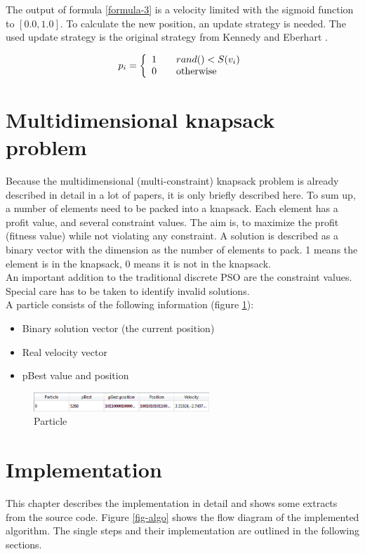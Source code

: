 \documentclass{article}
\begin{document}
The output of formula \ref{formula-3} is a velocity limited with the sigmoid function to $[0.0, 1.0]$. To calculate the new position, an update strategy is needed. The used update strategy is the original strategy from Kennedy and Eberhart \cite{bib-discrete}.

\begin{equation}
p_i = \left\{ 
\begin{array}{l l}
  1 & \quad \text{$rand() < S(v_i)$}\\
  0 & \quad \text{otherwise}
\end{array} \right.
\end{equation}


\section{Multidimensional knapsack problem}
\label{lbl-mknap}
Because the multidimensional (multi-constraint) knapsack problem is already described in detail in a lot of papers, it is only briefly described here. To sum up, a number of elements need to be packed into a knapsack. Each element has a profit value, and several constraint values. The aim is, to maximize the profit (fitness value) while not violating any constraint. A solution is described as a binary vector with the dimension as the number of elements to pack. 1 means the element is in the knapsack, 0 means it is not in the knapsack. \\ An important addition to the traditional discrete PSO are the constraint values. Special care has to be taken to identify invalid solutions.\\

A particle consists of the following information (figure \ref{fig-particle}):
\begin{itemize}
\item Binary solution vector (the current position)
\item Real velocity vector
\item pBest value and position
\end{itemize}

\begin{figure}[H]
    \centering
    \includegraphics[width=250px]{images/particle.PNG}
    \caption{Particle}
    \label{fig-particle}
\end{figure}

\section{Implementation}
\label{lbl-impl}
This chapter describes the implementation in detail and shows some extracts from the source code. Figure \ref{fig-algo} shows the flow diagram of the implemented algorithm. The single steps and their implementation are outlined in the following sections.
\end{document}
